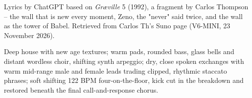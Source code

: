 
\begin{notes}
Lyrics by ChatGPT based on \emph{Gr\ae ville} 5 (1992), a fragment by Carlos Thompson -- the wall that is new every moment, Zeno, the "never" said twice, and the wall as the tower of Babel. Retrieved from Carlos Th's Suno page (V6-MINI, 23 November 2026).
\end{notes}
\begin{style}
Deep house with new age textures; warm pads, rounded bass, glass bells and distant wordless choir, shifting synth arpeggio; dry, close spoken exchanges with warm mid-range male and female leads trading clipped, rhythmic staccato phrases; soft shifting 122 BPM four-on-the-floor, kick cut in the breakdown and restored beneath the final call-and-response chorus.
\end{style}
